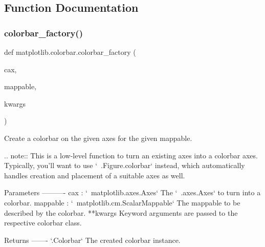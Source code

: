 \subsection{Function Documentation}
\mbox{\label{namespacematplotlib_1_1colorbar_ab5ea96cb637e6ca5d7e2eecdc692a1e4}} 
\subsubsection{\texorpdfstring{colorbar\+\_\+factory()}{colorbar\_factory()}}
{\footnotesize\ttfamily def matplotlib.\+colorbar.\+colorbar\+\_\+factory (\begin{DoxyParamCaption}\item[{}]{cax,  }\item[{}]{mappable,  }\item[{}]{kwargs }\end{DoxyParamCaption})}

\begin{DoxyVerb}Create a colorbar on the given axes for the given mappable.

.. note::
    This is a low-level function to turn an existing axes into a colorbar
    axes.  Typically, you'll want to use `~.Figure.colorbar` instead, which
    automatically handles creation and placement of a suitable axes as
    well.

Parameters
----------
cax : `~matplotlib.axes.Axes`
    The `~.axes.Axes` to turn into a colorbar.
mappable : `~matplotlib.cm.ScalarMappable`
    The mappable to be described by the colorbar.
**kwargs
    Keyword arguments are passed to the respective colorbar class.

Returns
-------
`.Colorbar`
    The created colorbar instance.
\end{DoxyVerb}
 \mbox{\label{namespacematplotlib_1_1colorbar_a2ed7fcd101af15c1a2ee35b0582e606a}} 
